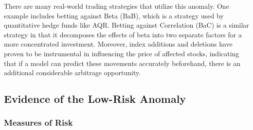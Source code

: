 \documentclass[12pt,twoside]{reedthesis}
\theoremstyle{definition}
\theoremstyle{definition}
\theoremstyle{definition}
\theoremstyle{remark}
\begin{document}
There are many real-world trading strategies that utilize this anomaly.
One example includes betting against Beta (BaB), which is a strategy
used by quantitative hedge funds like AQR. Betting against Correlation
(BaC) is a similar strategy in that it decomposes the effects of beta
into two separate factors for a more concentrated investment. Moreover,
index additions and deletions have proven to be instrumental in
influencing the price of affected stocks, indicating that if a model can
predict these movements accurately beforehand, there is an additional
considerable arbitrage opportunity.

\subsection{Evidence of the Low-Risk
Anomaly}\label{evidence-of-the-low-risk-anomaly}

\subsubsection{Measures of Risk}\label{measures-of-risk}
\end{document}
